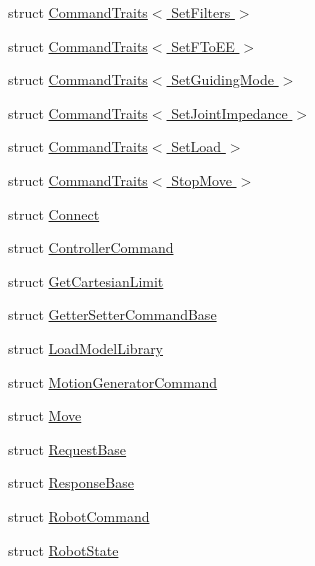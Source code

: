 \begin{DoxyCompactItemize}
\item 
struct \hyperlink{structresearch__interface_1_1robot_1_1CommandTraits_3_01SetFilters_01_4}{Command\+Traits$<$ Set\+Filters $>$}
\item 
struct \hyperlink{structresearch__interface_1_1robot_1_1CommandTraits_3_01SetFToEE_01_4}{Command\+Traits$<$ Set\+F\+To\+E\+E $>$}
\item 
struct \hyperlink{structresearch__interface_1_1robot_1_1CommandTraits_3_01SetGuidingMode_01_4}{Command\+Traits$<$ Set\+Guiding\+Mode $>$}
\item 
struct \hyperlink{structresearch__interface_1_1robot_1_1CommandTraits_3_01SetJointImpedance_01_4}{Command\+Traits$<$ Set\+Joint\+Impedance $>$}
\item 
struct \hyperlink{structresearch__interface_1_1robot_1_1CommandTraits_3_01SetLoad_01_4}{Command\+Traits$<$ Set\+Load $>$}
\item 
struct \hyperlink{structresearch__interface_1_1robot_1_1CommandTraits_3_01StopMove_01_4}{Command\+Traits$<$ Stop\+Move $>$}
\item 
struct \hyperlink{structresearch__interface_1_1robot_1_1Connect}{Connect}
\item 
struct \hyperlink{structresearch__interface_1_1robot_1_1ControllerCommand}{Controller\+Command}
\item 
struct \hyperlink{structresearch__interface_1_1robot_1_1GetCartesianLimit}{Get\+Cartesian\+Limit}
\item 
struct \hyperlink{structresearch__interface_1_1robot_1_1GetterSetterCommandBase}{Getter\+Setter\+Command\+Base}
\item 
struct \hyperlink{structresearch__interface_1_1robot_1_1LoadModelLibrary}{Load\+Model\+Library}
\item 
struct \hyperlink{structresearch__interface_1_1robot_1_1MotionGeneratorCommand}{Motion\+Generator\+Command}
\item 
struct \hyperlink{structresearch__interface_1_1robot_1_1Move}{Move}
\item 
struct \hyperlink{structresearch__interface_1_1robot_1_1RequestBase}{Request\+Base}
\item 
struct \hyperlink{structresearch__interface_1_1robot_1_1ResponseBase}{Response\+Base}
\item 
struct \hyperlink{structresearch__interface_1_1robot_1_1RobotCommand}{Robot\+Command}
\item 
struct \hyperlink{structresearch__interface_1_1robot_1_1RobotState}{Robot\+State}
\item 

\end{DoxyCompactItemize}
